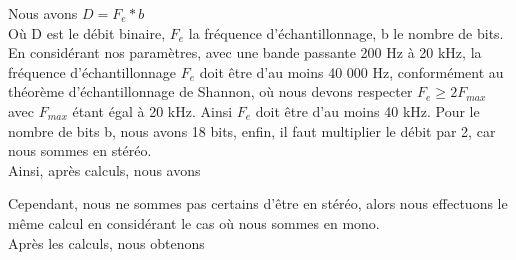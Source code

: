 Nous avons $D = F_e * b$
\\
Où D est le débit binaire, $F_e$ la fréquence d'échantillonnage, b le nombre de bits.
\\
En considérant nos paramètres, avec une bande passante 200 Hz à 20 kHz, la fréquence d'échantillonnage $F_e$ doit être d'au moins 40 000 Hz, conformément au théorème d'échantillonnage de Shannon, où nous devons respecter $F_e\ge 2F_{max}$ avec $F_{max}$ étant égal à 20 kHz. Ainsi $F_e$ doit être d'au moins 40 kHz. Pour le nombre de bits b, nous avons 18 bits, enfin, il faut multiplier le débit par 2, car nous sommes en stéréo. 
\\
Ainsi, après calculs, nous avons

Cependant, nous ne sommes pas certains d'être en stéréo, alors nous effectuons le même calcul en considérant le cas où nous sommes en mono.
\\
Après les calculs, nous obtenons 